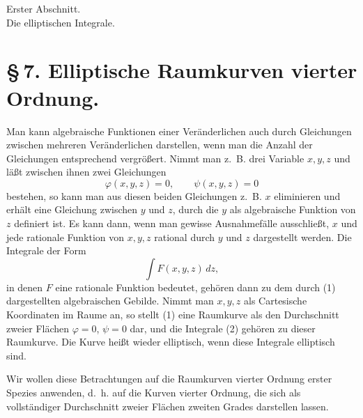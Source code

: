 \documentclass[11pt]{article}
\begin{document}
\begin{center}
{\large Erster Abschnitt.}\\[0.7em]
{\Large Die elliptischen Integrale.}
\end{center}

\section*{\S\,7. Elliptische Raumkurven vierter Ordnung.}

Man kann algebraische Funktionen einer Veränderlichen auch durch Gleichungen zwischen mehreren Veränderlichen darstellen, wenn man die Anzahl der Gleichungen entsprechend vergrößert. Nimmt man z.~B. drei Variable $x,y,z$ und läßt zwischen ihnen zwei Gleichungen
\begin{equation}
\varphi(x,y,z)=0,\qquad \psi(x,y,z)=0
\tag{1}
\end{equation}
bestehen, so kann man aus diesen beiden Gleichungen z.~B. $x$ eliminieren und erhält eine Gleichung zwischen $y$ und $z$, durch die $y$ als algebraische Funktion von $z$ definiert ist. Es kann dann, wenn man gewisse Ausnahmefälle ausschließt, $x$ und jede rationale Funktion von $x,y,z$ rational durch $y$ und $z$ dargestellt werden. Die Integrale der Form
\begin{equation}
\int F(x,y,z)\,dz,
\tag{2}
\end{equation}
in denen $F$ eine rationale Funktion bedeutet, gehören dann zu dem durch (1) dargestellten algebraischen Gebilde. Nimmt man $x,y,z$ als Cartesische Koordinaten im Raume an, so stellt (1) eine Raumkurve als den Durchschnitt zweier Flächen $\varphi=0$, $\psi=0$ dar, und die Integrale (2) gehören zu dieser Raumkurve. Die Kurve heißt wieder elliptisch, wenn diese Integrale elliptisch sind.

Wir wollen diese Betrachtungen auf die Raumkurven vierter Ordnung erster Spezies anwenden, d.~h. auf die Kurven vierter Ordnung, die sich als vollständiger Durchschnitt zweier Flächen zweiten Grades darstellen lassen.
\end{document}

